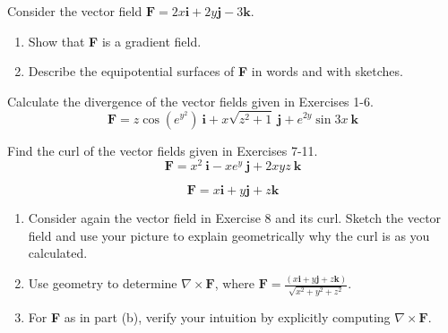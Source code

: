 \documentclass[12pt,letterpaper]{hmcpset}
\begin{document}

\begin{problem}[Colley 3.3.24]
    Consider the vector field
    $\textbf{F}=2x\textbf{i}+2y\textbf{j}-3\textbf{k}$.
    \begin{enumerate}
        \item Show that \textbf{F} is a gradient field.
        \item Describe the equipotential surfaces of \textbf{F} in
            words and with sketches.
    \end{enumerate}
\end{problem}
\begin{solution}
    \vfill
\end{solution}
\newpage

\begin{problem}[Colley 3.4.4]
    Calculate the divergence of the vector fields given in Exercises 1-6.
    \[
        \textbf{F}=z\cos(e^{y^2})\ \textbf{i}+x\sqrt{z^2+1}\ \textbf{j}
        +e^{2y}\sin3x\ \textbf{k}
    \]
\end{problem}
\begin{solution}
    \vfill
\end{solution}
\newpage

\begin{problem}[Colley 3.4.7]
    Find the curl of the vector fields given in Exercises 7-11.
    \[
        \textbf{F}=x^2\ \textbf{i}-xe^y\ \textbf{j}+2xyz\ \textbf{k}
    \]
\end{problem}
\begin{solution}
    \vfill
\end{solution}
\newpage

\begin{problem}[Colley 3.4.12]
    \begin{equation}\tag{3.4.8}
        \textbf{F}=x\textbf{i}+y\textbf{j}+z\textbf{k}
    \end{equation}
    \begin{enumerate}
        \item Consider again the vector field in Exercise 8 and its
            curl. Sketch the vector field and use your picture to
            explain geometrically why the curl is as you calculated.
        \item Use geometry to determine $\nabla\times\textbf{F}$,
            where $\displaystyle\textbf{F}=\frac{(x\textbf{i}+y\textbf{j}
            +z\textbf{k})}{\sqrt{x^2+y^2+z^2}}$.
        \item For \textbf{F} as in part (b), verify your intuition by
            explicitly computing $\nabla\times\textbf{F}$.
    \end{enumerate}
\end{problem}
\begin{solution}
    \vfill
\end{solution}
\newpage
\end{document}
